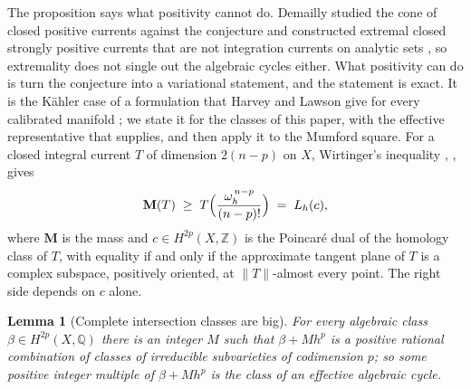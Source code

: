 \documentclass[11pt,reqno]{amsart}
\theoremstyle{plain}
\newtheorem{lemma}[theorem]{Lemma}
\theoremstyle{definition}
\theoremstyle{remark}
\newcommand{\QQ}{\mathbb{Q}}
\newcommand{\ZZ}{\mathbb{Z}}
\begin{document}
The proposition says what positivity cannot do. Demailly studied the cone of
closed positive currents against the conjecture and constructed extremal
closed strongly positive currents that are not integration currents on
analytic sets \cite{Dem82}, so extremality does not single out the algebraic
cycles either. What positivity can do is turn the conjecture into a
variational statement, and the statement is exact. It is the K\"ahler case of
a formulation that Harvey and Lawson give for every calibrated manifold
\cite[Section~6, Proposition~6.13 and Remarks~6.9 and~6.11]{HL09}; we state
it for the classes of this paper, with the effective representative that
 supplies, and then apply it to the Mumford square. For a
closed integral current $T$ of dimension $2(n-p)$ on $X$, Wirtinger's
inequality \cite[1.8.2]{Fed69}, \cite{HK74}, \cite[II.3]{HL82} gives
\begin{equation}\label{eq:wirtinger}
  \mathbf{M}(T)\;\ge\;T\Bigl(\frac{\omega_{h}^{\,n-p}}{(n-p)!}\Bigr)
  \;=\;L_{h}(c),
\end{equation}
where $\mathbf{M}$ is the mass and $c\in H^{2p}(X,\ZZ)$ is the Poincar\'e dual
of the homology class of $T$, with equality if and only if the approximate
tangent plane of $T$ is a complex subspace, positively oriented, at
$\|T\|$-almost every point. The right side depends on $c$ alone.

\begin{lemma}[Complete intersection classes are big]\label{lem:cibig}
For every algebraic class $\beta\in H^{2p}(X,\QQ)$ there is an integer $M$ such
that $\beta+Mh^{p}$ is a positive rational combination of classes of
irreducible subvarieties of codimension $p$; so some positive integer multiple
of $\beta+Mh^{p}$ is the class of an effective algebraic cycle.
\end{lemma}
\end{document}

